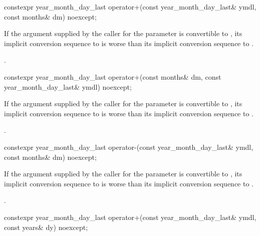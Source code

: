 %
\begin{itemdecl}
constexpr year_month_day_last
  operator+(const year_month_day_last& ymdl, const months& dm) noexcept;
\end{itemdecl}

\begin{itemdescr}
\pnum
\constraints
If the argument supplied by the caller for the  parameter
is convertible to ,
its implicit conversion sequence to 
is worse than its implicit conversion sequence to
.

\pnum
\returns
{}.
\end{itemdescr}

%
\begin{itemdecl}
constexpr year_month_day_last
  operator+(const months& dm, const year_month_day_last& ymdl) noexcept;
\end{itemdecl}

\begin{itemdescr}
\pnum
\constraints
If the argument supplied by the caller for the  parameter
is convertible to ,
its implicit conversion sequence to 
is worse than its implicit conversion sequence to
.

\pnum
\returns
{}.
\end{itemdescr}

%
\begin{itemdecl}
constexpr year_month_day_last
  operator-(const year_month_day_last& ymdl, const months& dm) noexcept;
\end{itemdecl}

\begin{itemdescr}
\pnum
\constraints
If the argument supplied by the caller for the  parameter
is convertible to ,
its implicit conversion sequence to 
is worse than its implicit conversion sequence to
.

\pnum
\returns
{}.
\end{itemdescr}

%
\begin{itemdecl}
constexpr year_month_day_last
  operator+(const year_month_day_last& ymdl, const years& dy) noexcept;
\end{itemdecl}

